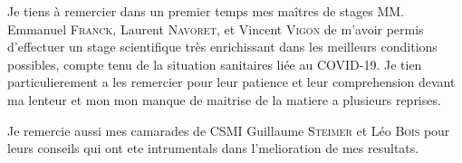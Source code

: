 \documentclass[ 
11pt, %
french, %
singlespacing, %
parskip, %
headsepline, %
openany, %
]{MastersDoctoralThesis} %
\begin{document}

\begin{acknowledgements}
\addchaptertocentry{\acknowledgementname} %
\qquad Je tiens à remercier dans un premier temps mes maîtres de stages MM. Emmanuel \textsc{Franck}, Laurent \textsc{Navoret}, et Vincent \textsc{Vigon} de m’avoir permis d’effectuer un stage scientifique très enrichissant dans les meilleurs conditions possibles, compte tenu de la situation sanitaires liée au COVID-19. Je tien particulierement a les remercier pour leur patience et leur comprehension devant ma lenteur et mon mon manque de maitrise de la matiere a plusieurs reprises.

Je remercie aussi mes camarades de CSMI Guillaume \textsc{Steimer} et Léo \textsc{Bois} pour leurs conseils qui ont ete intrumentals dans l'melioration de mes resultats.
\end{acknowledgements}


\tableofcontents %




% 
% 
\end{document}
